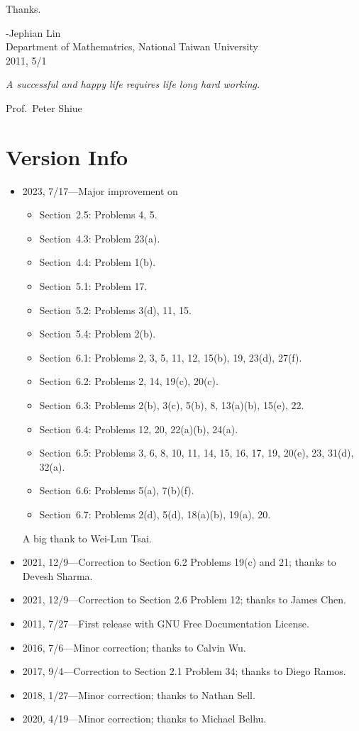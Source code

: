\documentclass{report}
\theoremstyle{definition}
\begin{document}
Thanks.

\begin{flushright}
-Jephian Lin\\
Department of Mathematrics, National Taiwan University\\
2011, 5/1
\end{flushright}

\textit{A successful and happy life requires life long hard working.}
\begin{flushright}
Prof.~Peter Shiue
\end{flushright}

\chapter*{Version Info}
\begin{itemize}
\item 2023, 7/17---Major improvement on
    \begin{itemize} 
    \item Section~2.5: Problems 4, 5.
    \item Section~4.3: Problem 23(a).  
    \item Section~4.4: Problem 1(b).  
    \item Section~5.1: Problem 17.  
    \item Section~5.2: Problems 3(d), 11, 15.  
    \item Section~5.4: Problem 2(b).
    \item Section~6.1: Problems 2, 3, 5, 11, 12, 15(b), 19, 23(d), 27(f).
    \item Section~6.2: Problems 2, 14, 19(c), 20(c).
    \item Section~6.3: Problems 2(b), 3(c), 5(b), 8, 13(a)(b), 15(e), 22.
    \item Section~6.4: Problems 12, 20, 22(a)(b), 24(a).
    \item Section~6.5: Problems 3, 6, 8, 10, 11, 14, 15, 16, 17, 19, 20(e), 23, 31(d), 32(a).
    \item Section~6.6: Problems 5(a), 7(b)(f).
    \item Section~6.7: Problems 2(d), 5(d), 18(a)(b), 19(a), 20.
    \end{itemize}
A big thank to Wei-Lun Tsai.
\item 2021, 12/9---Correction to Section 6.2 Problems 19(c) and 21; thanks to Devesh Sharma.
\item 2021, 12/9---Correction to Section 2.6 Problem 12; thanks to James Chen.
\item 2011, 7/27---First release with GNU Free Documentation License.
\item 2016, 7/6---Minor correction; thanks to Calvin Wu.
\item 2017, 9/4---Correction to Section 2.1 Problem 34; thanks to Diego Ramos. 
\item 2018, 1/27---Minor correction; thanks to Nathan Sell.
\item 2020, 4/19---Minor correction; thanks to Michael Belhu.
\end{itemize}
\end{document}
